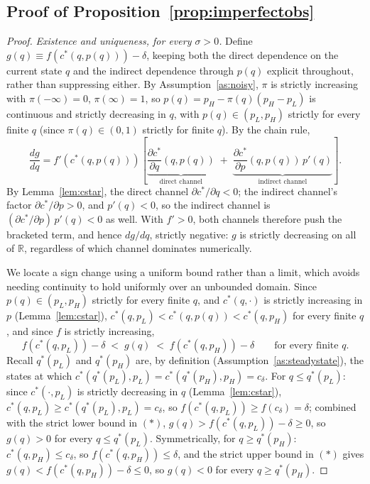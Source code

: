 \subsection{Proof of Proposition~\ref{prop:imperfectobs}}
\begin{proof}
\emph{Existence and uniqueness, for every $\sigma>0$.} Define $g(q) \equiv f(c^*(q,p(q))) - \delta$, keeping both the direct dependence on the current state $q$ and the indirect dependence through $p(q)$ explicit throughout, rather than suppressing either. By Assumption~\ref{as:noisy}, $\pi$ is strictly increasing with $\pi(-\infty)=0$, $\pi(\infty)=1$, so $p(q) = p_H - \pi(q)(p_H-p_L)$ is continuous and strictly decreasing in $q$, with $p(q) \in (p_L,p_H)$ strictly for every finite $q$ (since $\pi(q)\in(0,1)$ strictly for finite $q$). By the chain rule,
\[
\frac{dg}{dq} = f'(c^*(q,p(q))) \left[ \underbrace{\frac{\partial c^*}{\partial q}(q,p(q))}_{\text{direct channel}} \;+\; \underbrace{\frac{\partial c^*}{\partial p}(q,p(q))\, p'(q)}_{\text{indirect channel}} \right].
\]
By Lemma~\ref{lem:cstar}, the direct channel $\partial c^*/\partial q < 0$; the indirect channel's factor $\partial c^*/\partial p > 0$, and $p'(q) < 0$, so the indirect channel is $(\partial c^*/\partial p)\,p'(q) < 0$ as well. With $f' > 0$, both channels therefore push the bracketed term, and hence $dg/dq$, strictly negative: $g$ is strictly decreasing on all of $\mathbb{R}$, regardless of which channel dominates numerically.

We locate a sign change using a uniform bound rather than a limit, which avoids needing continuity to hold uniformly over an unbounded domain. Since $p(q)\in(p_L,p_H)$ strictly for every finite $q$, and $c^*(q,\cdot)$ is strictly increasing in $p$ (Lemma~\ref{lem:cstar}), $c^*(q,p_L) < c^*(q,p(q)) < c^*(q,p_H)$ for every finite $q$, and since $f$ is strictly increasing,
\[
f(c^*(q,p_L)) - \delta \;<\; g(q) \;<\; f(c^*(q,p_H)) - \delta \qquad \text{for every finite } q. \tag{$\ast$}
\]
Recall $q^*(p_L)$ and $q^*(p_H)$ are, by definition (Assumption~\ref{as:steadystate}), the states at which $c^*(q^*(p_L),p_L) = c^*(q^*(p_H),p_H) = c_\delta$. For $q \leq q^*(p_L)$: since $c^*(\cdot,p_L)$ is strictly decreasing in $q$ (Lemma~\ref{lem:cstar}), $c^*(q,p_L) \geq c^*(q^*(p_L),p_L) = c_\delta$, so $f(c^*(q,p_L)) \geq f(c_\delta) = \delta$; combined with the strict lower bound in $(\ast)$, $g(q) > f(c^*(q,p_L))-\delta \geq 0$, so $g(q) > 0$ for every $q \leq q^*(p_L)$. Symmetrically, for $q \geq q^*(p_H)$: $c^*(q,p_H) \leq c_\delta$, so $f(c^*(q,p_H)) \leq \delta$, and the strict upper bound in $(\ast)$ gives $g(q) < f(c^*(q,p_H))-\delta \leq 0$, so $g(q) < 0$ for every $q \geq q^*(p_H)$.


\end{proof}
